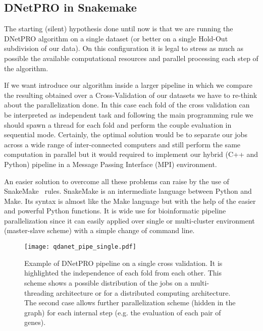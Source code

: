 \documentclass{standalone}
\begin{document}
\subsection[Pipeline]{DNetPRO in Snakemake}\label{implementation:snakemake}

The starting (silent) hypothesis done until now is that we are running the DNetPRO algorithm on a single dataset (or better on a single Hold-Out subdivision of our data).
On this configuration it is legal to stress as much as possible the available computational resources and parallel processing each step of the algorithm.

If we want introduce our algorithm inside a larger pipeline in which we compare the resulting obtained over a Cross-Validation of our datasets we have to re-think about the parallelization done.
In this case each fold of the cross validation can be interpreted as independent task and following the main programming rule \emph{} we should spawn a thread for each fold and perform the couple evaluation in sequential mode.
Certainly, the optimal solution would be to separate our jobs across a wide range of inter-connected computers and still perform the same computation in parallel but it would required to implement our hybrid (C++ and Python) pipeline in a Message Passing Interface (MPI) environment.

An easier solution to overcome all these problems can raise by the use of SnakeMake~\cite{snakemake} rules.
SnakeMake is an intermediate language between Python and Make.
Its syntax is almost like the Make language but with the help of the easier and powerful Python functions.
It is wide use for bioinformatic pipeline parallelization since it can easily applied over single or multi-cluster environment (master-slave scheme) with a simple change of command line.

\begin{center}
\begin{figure}[htbp]
\hspace{-2cm}
\texttt{[image: qdanet\_pipe\_single.pdf]}
\caption{Example of DNetPRO pipeline on a single cross validation.
It is highlighted the independence of each fold from each other.
This scheme shows a possible distribution of the jobs on a multi-threading architecture or for a distributed computing architecture.
The second case allows further parallelization scheme (hidden in the graph) for each internal step (e.g. the evaluation of each pair of genes).
}
\label{fig:dnet_workflow}
\end{figure}
\end{center}
\end{document}

